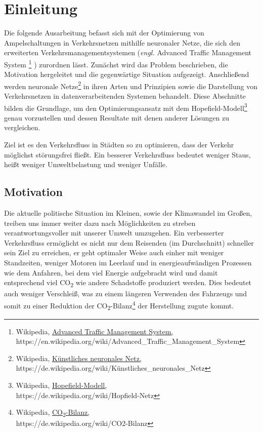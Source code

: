 \section{Einleitung}

Die folgende Ausarbeitung befasst sich mit der Optimierung von Ampelschaltungen in Verkehrsnetzen mithilfe neuronaler Netze, die sich den erweiterten Verkehrsmanagementsystemen (\textit{engl.} Advanced Traffic Management System
\footnote{
Wikipedia, \href{
https://en.wikipedia.org/wiki/Advanced\_Traffic\_Management\_System
}{
Advanced Traffic Management System,
} \\
https://en.wikipedia.org/wiki/Advanced\_Traffic\_Management\_System
}
)
zurordnen lässt. Zunächst wird das Problem beschrieben, die Motivation hergeleitet und die gegenwärtige Situation aufgezeigt. Anschließend werden neuronale Netze\footnote{Wikipedia, \href{https://de.wikipedia.org/wiki/K\%C3\%BCnstliches\_neuronales\_Netz}{Künstliches neuronales Netz,} \\ https://de.wikipedia.org/wiki/Künstliches\_neuronales\_Netz} in ihren Arten und Prinzipien sowie die Darstellung von Verkehrsnetzen in datenverarbeitenden Systemen behandelt. Diese Abschnitte bilden die Grundlage, um den Optimierungsansatz mit dem Hopefield-Modell\footnote{Wikipedia, \href{https://de.wikipedia.org/wiki/Hopfield-Netz}{Hopefield-Modell,} \\ https://de.wikipedia.org/wiki/Hopfield-Netz} genau vorzustellen und dessen Resultate mit denen anderer Lösungen zu vergleichen.

Ziel ist es den Verkehrsfluss in Städten so zu optimieren, dass der Verkehr möglichst störungsfrei fließt. Ein besserer Verkehrsfluss bedeutet weniger Staus, heißt weniger Umweltbelastung und weniger Unfälle.

\subsection{Motivation}

Die aktuelle politische Situation im Kleinen, sowie der Klimawandel im Großen, treiben uns immer weiter dazu nach Möglichkeiten zu streben verantwortungsvoller mit unserer Umwelt umzugehen. Ein verbesserter Verkehrsfluss ermöglicht es nicht nur dem Reisenden (im Durchschnitt) schneller sein Ziel zu erreichen, er geht optimaler Weise auch einher mit weniger Standzeiten, weniger Motoren im Leerlauf und in energieaufwändigen Prozessen wie dem Anfahren, bei dem viel Energie aufgebracht wird und damit entsprechend viel CO\textsubscript{2} wie andere Schadstoffe produziert werden. Dies bedeutet auch weniger Verschleiß, was zu einem längeren Verwenden des Fahrzeugs und somit zu einer Reduktion der CO\textsubscript{2}-Bilanz\footnote{Wikipedia, \href{https://de.wikipedia.org/wiki/CO2-Bilanz}{CO\textsubscript{2}-Bilanz,} \\https://de.wikipedia.org/wiki/CO2-Bilanz} der Herstellung zugute kommt.

